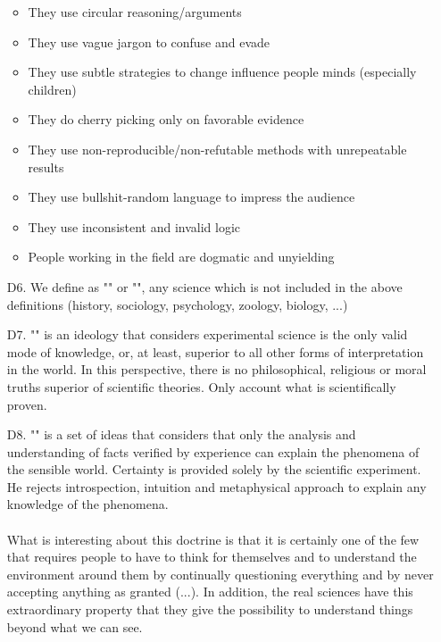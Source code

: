 \begin{itemize}
\begin{itemize}
		\item They use circular reasoning/arguments

		\item They use vague jargon to confuse and evade

		\item They use subtle strategies to change influence people minds (especially children)

		\item They do cherry picking only on favorable evidence

		\item They use non-reproducible/non-refutable methods with unrepeatable results

		\item They use bullshit-random language to impress the audience

		\item They use inconsistent and invalid logic

		\item People working in the field are dogmatic and unyielding
	\end{itemize}

	\item[D6.] We define as "" or "", any science which is not included in the above definitions (history, sociology, psychology, zoology, biology, ...) 

	\item[D7.] "" is an ideology that considers experimental science is the only valid mode of knowledge, or, at least, superior to all other forms of interpretation in the world. In this perspective, there is no philosophical, religious or moral truths superior of scientific theories. Only account what is scientifically proven. 

	\item[D8.] "" is a set of ideas that considers that only the analysis and understanding of facts verified by experience can explain the phenomena of the sensible world. Certainty is provided solely by the scientific experiment. He rejects introspection, intuition and metaphysical approach to explain any knowledge of the phenomena. \\\\
	What is interesting about this doctrine is that it is certainly one of the few that requires people to have to think for themselves and to understand the environment around them by continually questioning everything and by never accepting anything as granted (...). In addition, the real sciences have this extraordinary property that they give the possibility to understand things beyond what we can see. 
\end{itemize}

